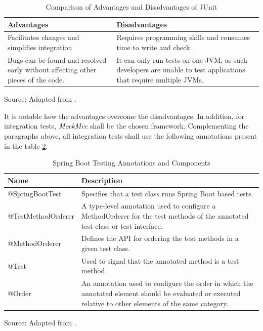 \begin{table}[h]
    \centering
    \caption{Comparison of Advantages and Disadvantages of JUnit}
    \label{tab:junit_comparison_advantages_disadvantages}
    \begin{tabular}{p{} p{}}
        \hline
        \textbf{Advantages} & \textbf{Disadvantages} \\
        \hline
        Facilitates changes and simplifies integration & Requires programming skills and consumes time to write and check. \\
        \hline
        Bugs can be found and resolved early without affecting other pieces of the code. & It can only run tests on one JVM, as such developers are unable to test applications that require multiple JVMs. \\
        \hline
    \end{tabular}
    \footnotesize Source: Adapted from \cite{umar2019study}.
\end{table}

It is notable how the advantages overcome the disadvantages. In addition, for integration tests, \textit{MockMvc} shall be the chosen framework. 
Complementing the paragraphs above, all integration tests shall use the following annotations present in the table \ref{table:integration_tests_annotations}.

\begin{table}[H]
\centering
\caption{Spring Boot Testing Annotations and Components}
\label{table:integration_tests_annotations}
\begin{tabular}{p{}p{}}
\toprule
\textbf{Name} & \textbf{Description} \\
\midrule
@SpringBootTest & Specifies that a test class runs Spring Boot based tests. \\ \hline
@TestMethodOrderer & A type-level annotation used to configure a MethodOrderer for the test methods of the annotated test class or test interface. \\ \hline
@MethodOrderer & Defines the API for ordering the test methods in a given test class. \\ \hline
@Test & Used to signal that the annotated method is a test method. \\ \hline
@Order & An annotation used to configure the order in which the annotated element should be evaluated or executed relative to other elements of the same category. \\
\bottomrule
\end{tabular}
\footnotesize Source: Adapted from \cite{junit5_methodorderer_api, junit5_order_api, junit5_test_api, junit5testmethodorder_api, springboottest_api}.
\end{table}

